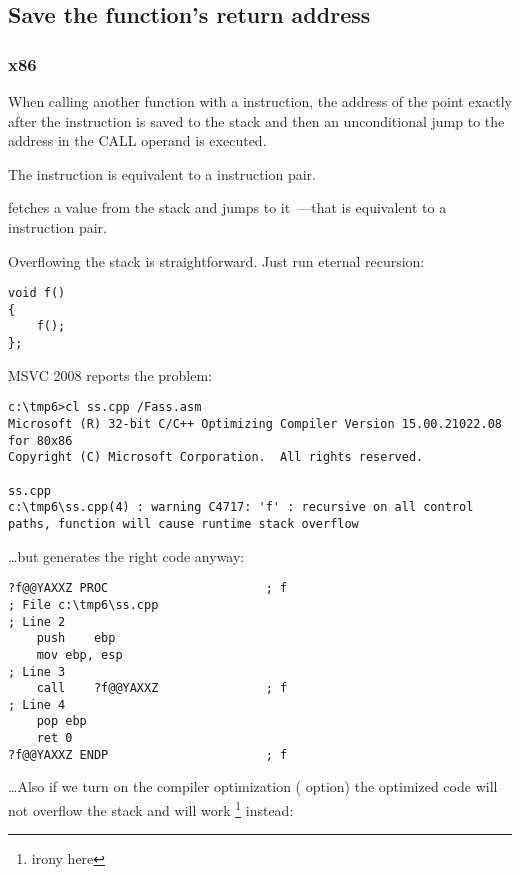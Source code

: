 \subsection{Save the function's return address}

\subsubsection{x86}

When calling another function with a \CALL instruction, the address of the point exactly after the \CALL instruction is saved 
to the stack and then an unconditional jump to the address in the CALL operand is executed.

The \CALL instruction is equivalent to a  instruction pair.

\RET fetches a value from the stack and jumps to it~---that is equivalent to a  instruction pair.

\myindex{\Recursion}
Overflowing the stack is straightforward. Just run eternal recursion:

\begin{lstlisting}
void f()
{
	f();
};
\end{lstlisting}

MSVC 2008 reports the problem:

\begin{lstlisting}
c:\tmp6>cl ss.cpp /Fass.asm
Microsoft (R) 32-bit C/C++ Optimizing Compiler Version 15.00.21022.08 for 80x86
Copyright (C) Microsoft Corporation.  All rights reserved.

ss.cpp
c:\tmp6\ss.cpp(4) : warning C4717: 'f' : recursive on all control paths, function will cause runtime stack overflow
\end{lstlisting}

\dots but generates the right code anyway:

\begin{lstlisting}
?f@@YAXXZ PROC						; f
; File c:\tmp6\ss.cpp
; Line 2
	push	ebp
	mov	ebp, esp
; Line 3
	call	?f@@YAXXZ				; f
; Line 4
	pop	ebp
	ret	0
?f@@YAXXZ ENDP						; f
\end{lstlisting}

\dots Also if we turn on the compiler optimization (\TT{\Ox} option) the optimized code will not overflow the stack 
and will work \footnote{irony here} instead:

